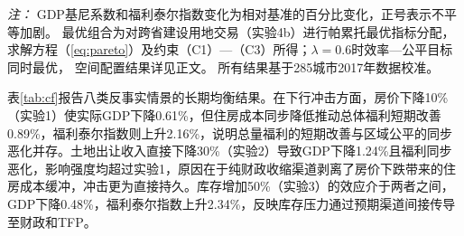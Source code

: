 \documentclass[UTF8,a4paper,12pt]{ctexart}
\theoremstyle{plain}
\theoremstyle{definition}
\theoremstyle{remark}
\begin{document}
\begin{table}[htbp]
  \centering
  \caption{反事实实验结果汇总}
  \label{tab:cf}
  \vspace{4pt}
  \begin{minipage}{0.95\textwidth}
  {\textit{注：}
    GDP基尼系数和福利泰尔指数变化为相对基准的百分比变化，正号表示不平等加剧。
    最优组合为对跨省建设用地交易（实验4b）进行帕累托最优指标分配，
    求解方程（\ref{eq:pareto}）及约束（C1）—（C3）所得；$\lambda=0.6$时效率—公平目标同时最优，
    空间配置结果详见正文。
    所有结果基于285城市2017年数据校准。}
  \end{minipage}
\end{table}

表\ref{tab:cf}报告八类反事实情景的长期均衡结果。在下行冲击方面，房价下降10\%（实验1）使实际GDP下降0.61\%，但住房成本同步降低推动总体福利短期改善0.89\%，福利泰尔指数则上升2.16\%，说明总量福利的短期改善与区域公平的同步恶化并存。土地出让收入直接下降30\%（实验2）导致GDP下降1.24\%且福利同步恶化，影响强度均超过实验1，原因在于纯财政收缩渠道剥离了房价下跌带来的住房成本缓冲，冲击更为直接持久。库存增加50\%（实验3）的效应介于两者之间，GDP下降0.48\%，福利泰尔指数上升2.34\%，反映库存压力通过预期渠道间接传导至财政和TFP。
\end{document}
